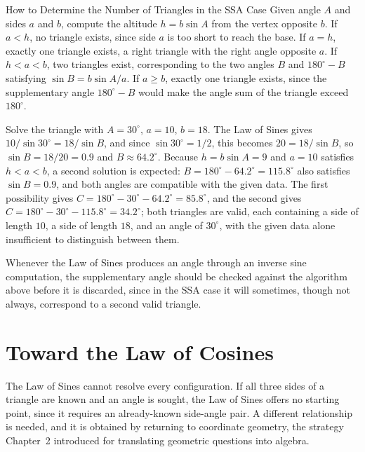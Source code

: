 \begin{algorithmproc}{How to Determine the Number of Triangles in the SSA Case}
Given angle $A$ and sides $a$ and $b$, compute the altitude $h = b\sin A$
from the vertex opposite $b$. If $a < h$, no triangle exists, since side
$a$ is too short to reach the base. If $a = h$, exactly one triangle
exists, a right triangle with the right angle opposite $a$. If $h < a <
b$, two triangles exist, corresponding to the two angles $B$ and $180^\circ
- B$ satisfying $\sin B = b\sin A / a$. If $a \geq b$, exactly one triangle
exists, since the supplementary angle $180^\circ - B$ would make the angle
sum of the triangle exceed $180^\circ$.
\end{algorithmproc}

\begin{example}
Solve the triangle with $A = 30^\circ$, $a = 10$, $b = 18$. The Law of
Sines gives $10/\sin30^\circ = 18/\sin B$, and since $\sin30^\circ =
1/2$, this becomes $20 = 18/\sin B$, so $\sin B = 18/20 = 0.9$ and $B
\approx 64.2^\circ$. Because $h = b\sin A = 9$ and $a = 10$ satisfies $h <
a < b$, a second solution is expected: $B = 180^\circ - 64.2^\circ =
115.8^\circ$ also satisfies $\sin B = 0.9$, and both angles are compatible
with the given data. The first possibility gives $C = 180^\circ - 30^\circ
- 64.2^\circ = 85.8^\circ$, and the second gives $C = 180^\circ - 30^\circ
- 115.8^\circ = 34.2^\circ$; both triangles are valid, each containing a
side of length $10$, a side of length $18$, and an angle of $30^\circ$,
with the given data alone insufficient to distinguish between them.
\end{example}

Whenever the Law of Sines produces an angle through an inverse sine
computation, the supplementary angle should be checked against the
algorithm above before it is discarded, since in the SSA case it will
sometimes, though not always, correspond to a second valid triangle.

\section{Toward the Law of Cosines}

The Law of Sines cannot resolve every configuration. If all three sides
of a triangle are known and an angle is sought, the Law of Sines offers no
starting point, since it requires an already-known side-angle pair. A
different relationship is needed, and it is obtained by returning to
coordinate geometry, the strategy Chapter~2 introduced for translating
geometric questions into algebra.


